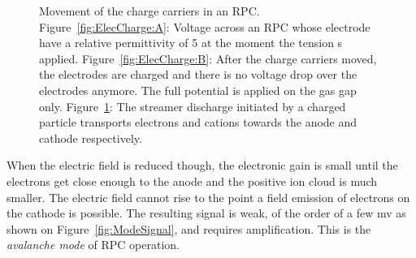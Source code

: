 \begin{figure}[!h]
\begin{subfigure}{\linewidth}
			\caption{\label{fig:ElecCharge:C}}
		\end{subfigure}
		\caption{\label{fig:ElecCharge} Movement of the charge carriers in an RPC. Figure~\ref{fig:ElecCharge:A}: Voltage across an RPC whose electrode have a relative permittivity of 5 at the moment the tension s applied. Figure~\ref{fig:ElecCharge:B}: After the charge carriers moved, the electrodes are charged and there is no voltage drop over the electrodes anymore. The full potential is applied on the gas gap only. Figure~\ref{fig:ElecCharge:C}: The streamer discharge initiated by a charged particle transports electrons and cations towards the anode and cathode respectively.}
	\end{figure}
	
	When the electric field is reduced though, the electronic gain is small until the electrons get close enough to the anode and the positive ion cloud is much smaller. The electric field cannot rise to the point a field emission of electrons on the cathode is possible. The resulting signal is weak, of the order of a few \si{mv} as shown on Figure~\ref{fig:ModeSignal}, and requires amplification. This is the \textit{avalanche mode} of RPC operation.
	
